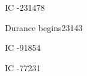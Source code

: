 \newcommand{\Mister}           {Mister{}\xspace}
\newcommand{\Mr}               {\Mister{}\xspace}
\newcommand{\Mistress}         {Mistress{}\xspace}
\newcommand{\Mrs}              {\Mistress{}\xspace}
\newcommand{\Miss}             {Miss{}\xspace}
\newcommand{\Dai}              {Dai-{}\xspace}
\newcommand{\dai}              {dai-{}\xspace}
\newcommand{\Rao}              {Rao-{}\xspace}
\newcommand{\rao}              {rao-{}\xspace}









\begin{comment}
\chapter{Draconic Faction}
\end{comment}









\begin{comment}
\section{\Ophidians}
\end{comment}

\newcommand{\Sethican}         {Sethican\xspace}
\newcommand{\Sethicus}         {Sethicus\xspace}
\newcommand{\ValcanSethicus}   {\Valcan{} Sethicus\xspace}
\newcommand{\VardredSethicus}  {\Valcan{} Sethicus\xspace}
\newcommand{\Vardred}          {\Valcan}
\newcommand{\Valcan}           {Valcan\xspace}

\newcommand{\Hesherritan}      {Hesherritan\xspace}
      {IC} {-231478}

\newcommand{\Ishtacca}         {Ishtacca\xspace}
         {Durance begins}{23143}

\newcommand{\Nasshikerr}       {Nasshiker\xspace}
       {IC} {-91854}

\newcommand{\NathRamos}        {Nath Ramos\xspace}

\newcommand{\ZeethanKraal}     {Zeethan \Kraal}
\newcommand{\Kraal}            {Kraal\xspace}
    {IC} {-77231}








